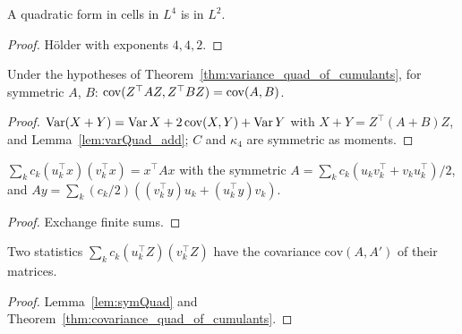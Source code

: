 \begin{lemma}\label{lem:Cumulants_memLp_quadForm}
  \leanok
  A quadratic form in cells in $L^4$ is in $L^2$.
\end{lemma}
\begin{proof}
  \leanok
  Hölder with exponents $4, 4, 2$.
\end{proof}

\begin{theorem}\label{thm:covariance_quad_of_cumulants}
  \leanok
  Under the hypotheses of Theorem~\ref{thm:variance_quad_of_cumulants}, for symmetric $A$, $B$:
  $\operatorname{cov}(Z^\top AZ, Z^\top BZ) = \mathrm{cov}(A, B)$.
\end{theorem}
\begin{proof}
  \leanok
  $\operatorname{Var}(X + Y) = \operatorname{Var} X + 2\operatorname{cov}(X, Y) + \operatorname{Var} Y$ with $X + Y = Z^\top(A + B)Z$, and
  Lemma~\ref{lem:varQuad_add}; $C$ and $\kappa_4$ are symmetric as moments.
\end{proof}

\begin{lemma}\label{lem:symQuad}
  \leanok
  $\sum_k c_k(u_k^\top x)(v_k^\top x) = x^\top Ax$ with the symmetric
  $A = \sum_k c_k(u_kv_k^\top + v_ku_k^\top)/2$, and
  $Ay = \sum_k (c_k/2)((v_k^\top y)u_k + (u_k^\top y)v_k)$.
\end{lemma}
\begin{proof}
  \leanok
  Exchange finite sums.
\end{proof}

\begin{theorem}\label{thm:covariance_symQuad}
  \leanok
  Two statistics $\sum_k c_k(u_k^\top Z)(v_k^\top Z)$ have the covariance $\mathrm{cov}(A, A')$
  of their matrices.
\end{theorem}
\begin{proof}
  \leanok
  Lemma~\ref{lem:symQuad} and Theorem~\ref{thm:covariance_quad_of_cumulants}.
\end{proof}

